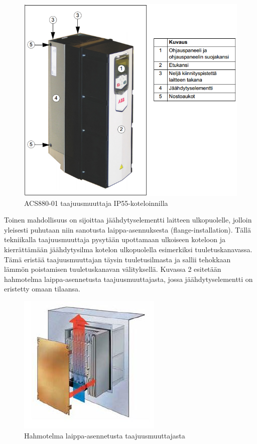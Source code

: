 \documentclass[finnish,12pt,a4paper,pdftex,elec,utf8]{aaltothesis}
\begin{document}
\begin{figure}[H]
	\begin{center}
	\includegraphics[scale=0.9]{IP55}
	\end{center}
	\caption{ACS880-01 taajuusmuuttaja IP55-koteloinnilla
		\cite[s.28]{880hwman}}
	\label{fig:IP55}
\end{figure}

\noindent
Toinen mahdollisuus on sijoittaa jäähdytyselementti laitteen ulkopuolelle, jolloin yleisesti puhutaan niin sanotusta laippa-asennuksesta (flange-installation). Tällä tekniikalla taajuusmuuttaja pysytään upottamaan ulkoiseen koteloon ja kierrättämään jäähdytysilma kotelon ulkopuolella esimerkiksi tuuletuskanavassa. Tämä eristää taajuusmuuttajan täysin tuuletusilmasta ja sallii tehokkaan lämmön poistamisen tuuletuskanavan välityksellä. Kuvassa 2 esitetään hahmotelma laippa-asennetusta taajuusmuuttajasta, jossa jäähdytyselementti on eristetty omaan tilaansa.

\begin{figure}[H]
	\begin{center}
	\includegraphics{flange}
	\end{center}
	\caption{Hahmotelma laippa-asennetusta taajuusmuuttajasta
		\cite[s.6]{danfoss}}
	\label{fig:flange}
\end{figure}
\end{document}
